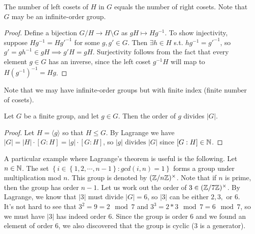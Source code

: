 \begin{theorem}
  The number of left cosets of $H$ in $G$ equals the number of right cosets. Note that $G$
  may be an infinite-order group.
\end{theorem}
\begin{proof}
  Define a bijection $G/H\to H\setminus G$ as $gH\mapsto Hg^{-1}$. To show injectivity,
  suppose $Hg^{-1}=Hg'^{-1}$ for some $g,g'\in G$. Then $\exists h\in H$ s.t.
  $hg^{-1} = g'^{-1}$, so $g' = gh^{-1}\in gH \implies g'H=gH$. Surjectivity follows from
  the fact that every element $g \in G$ has an inverse, since the left coset $g^{-1}H$ will map to $H\left(g^{-1}\right)^{-1} = Hg$.
\end{proof}

Note that we may have infinite-order groups but with finite index (finite number of
cosets).

\begin{corollary}
  Let $G$ be a finite group, and let $g\in G$. Then the order of $g$ divides $|G|$.
  \label{lagrangeConsequence}
\end{corollary}
\begin{proof}
  Let $H=\langle g \rangle$ so that $H\leq G$. By Lagrange we have $|G|=|H|\cdot[G:H]=|g| \cdot [G:H]$, so $\lvert g\rvert \text{ divides } |G|$ since $[G:H] \in \mathbb N$.
\end{proof}

\begin{example}
  A particular example where Lagrange's theorem is useful is the following. Let
  $n\in\mathbb N$. The set $\left\{ i\in \left\{ 1,2,\cdots,n-1 \right\} : gcd(i,n)=1 \right\}$
  forms a group under multiplication mod $n$. This group is denoted by
  $(\mathbb Z/n\mathbb Z)^{\times}$. Note that if $n$ is prime, then the group has order $n-1$. Let us
  work out the order of $3\in (\mathbb Z/7\mathbb Z)^{\times}$. By Lagrange, we know that $|3|$ must
  divide $|G|=6$, so $|3|$ can be either $2,3,$ or $6$. It's not hard to see that
  $3^2=9=2\mod 7$ and $3^3=2*3\mod 7=6\mod 7$, so we must have $|3|$ has indeed order $6$. Since the group
  is order $6$ and we found an element of order $6$, we also discovered that the group is
  cyclic ($3$ is a generator).
\end{example}
